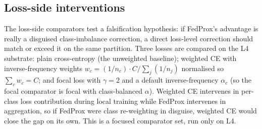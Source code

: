 \documentclass[11pt,a4paper]{report}
\begin{document}
\begin{table}[H]
\centering
\small
\caption{Four-condition decomposition design (L4, two-client, Regime~B,
$E_{\textrm{straggler}} = 5$ on Client~1, $n = 3$ matched seeds per
cell). Holding the partition and schedule fixed across all four cells
isolates the optimiser-vs-protocol contribution. The design omits the
FedAvg + $\gamma$-inexact cell, so the $\gamma$-inexact attribution is
to the FedProx + $\gamma$-inexact \emph{protocol} rather than to
$\gamma$-inexact acceptance as a standalone universal mechanism.}
\label{tab:four-condition-design}
\end{table}

\subsection{Loss-side interventions}
\label{sec:method-losses}

The loss-side comparators test a falsification hypothesis: if FedProx's advantage
is really a disguised class-imbalance correction, a direct loss-level correction
should match or exceed it on the same partition. Three losses are compared on the
L4 substrate: plain cross-entropy (the unweighted baseline); weighted CE with
inverse-frequency weights $w_c = (1/n_c)\cdot C / \sum_j (1/n_j)$ normalised so
$\sum_c w_c = C$; and focal loss \citep{lin2017focal} with $\gamma = 2$ and a
default inverse-frequency $\alpha_c$ (so the focal comparator is focal with
class-balanced $\alpha$). Weighted CE intervenes in per-class loss contribution
during local training while FedProx intervenes in aggregation, so if FedProx were
class re-weighting in disguise, weighted CE would close the gap on its own. This is
a focused comparator set, run only on L4.
\end{document}
